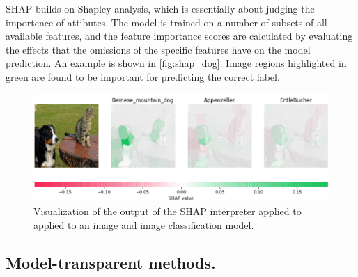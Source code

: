 

 SHAP \cite{lundberg2017unified} builds on Shapley analysis, which is essentially about judging the importence of attibutes. The model is trained on a number of subsets of all available features, and the feature importance scores are calculated by evaluating the effects that the omissions of the specific features have on the model prediction. An example is shown in \autoref{fig:shap_dog}. Image regions highlighted in green are found to be important for predicting the correct label.

\begin{figure}[ht]
  \centering
  \includegraphics[width=\linewidth]{figures/cat_dog_shap.png}
  \caption{Visualization of the output of the SHAP interpreter applied to applied to an image and image classification model.}\label{fig:shap_dog}
  \vspace{-0.3cm}
\end{figure}


\subsection{Model-transparent methods.}
\label{subsec:wb_methods}


